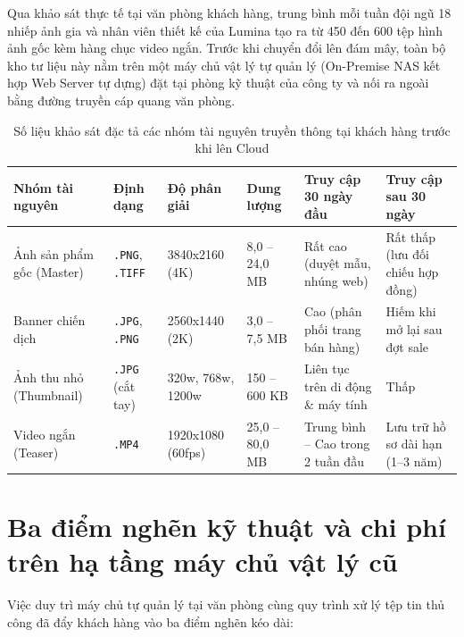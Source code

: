 \documentclass[12pt,a4paper]{report}
\begin{document}
Qua khảo sát thực tế tại văn phòng khách hàng, trung bình mỗi tuần đội ngũ 18 nhiếp ảnh gia và nhân viên thiết kế của Lumina tạo ra từ 450 đến 600 tệp hình ảnh gốc kèm hàng chục video ngắn. Trước khi chuyển đổi lên đám mây, toàn bộ kho tư liệu này nằm trên một máy chủ vật lý tự quản lý (On-Premise NAS kết hợp Web Server tự dựng) đặt tại phòng kỹ thuật của công ty và nối ra ngoài bằng đường truyền cáp quang văn phòng.

\begin{table}[H]
  \centering
  \caption{Số liệu khảo sát đặc tả các nhóm tài nguyên truyền thông tại khách hàng trước khi lên Cloud}
  \label{tab:khaosat}
  \footnotesize
  \renewcommand{\arraystretch}{1.25}
  \begin{tabularx}{\textwidth}{|L{3.2cm}|C{1.8cm}|C{2.1cm}|C{2.2cm}|Y|Y|}
    \hline
    \textbf{Nhóm tài nguyên} & \textbf{Định dạng} & \textbf{Độ phân giải} & \textbf{Dung lượng} & \textbf{Truy cập 30 ngày đầu} & \textbf{Truy cập sau 30 ngày} \\
    \hline
    Ảnh sản phẩm gốc (Master) & \texttt{.PNG}, \texttt{.TIFF} & 3840x2160 (4K) & 8,0 -- 24,0 MB & Rất cao (duyệt mẫu, nhúng web) & Rất thấp (lưu đối chiếu hợp đồng) \\ \hline
    Banner chiến dịch & \texttt{.JPG}, \texttt{.PNG} & 2560x1440 (2K) & 3,0 -- 7,5 MB & Cao (phân phối trang bán hàng) & Hiếm khi mở lại sau đợt sale \\ \hline
    Ảnh thu nhỏ (Thumbnail) & \texttt{.JPG} (cắt tay) & 320w, 768w, 1200w & 150 -- 600 KB & Liên tục trên di động \& máy tính & Thấp \\ \hline
    Video ngắn (Teaser) & \texttt{.MP4} & 1920x1080 (60fps) & 25,0 -- 80,0 MB & Trung bình -- Cao trong 2 tuần đầu & Lưu trữ hồ sơ dài hạn (1--3 năm) \\ \hline
  \end{tabularx}
\end{table}

\section{Ba điểm nghẽn kỹ thuật và chi phí trên hạ tầng máy chủ vật lý cũ}
Việc duy trì máy chủ tự quản lý tại văn phòng cùng quy trình xử lý tệp tin thủ công đã đẩy khách hàng vào ba điểm nghẽn kéo dài:
\end{document}

